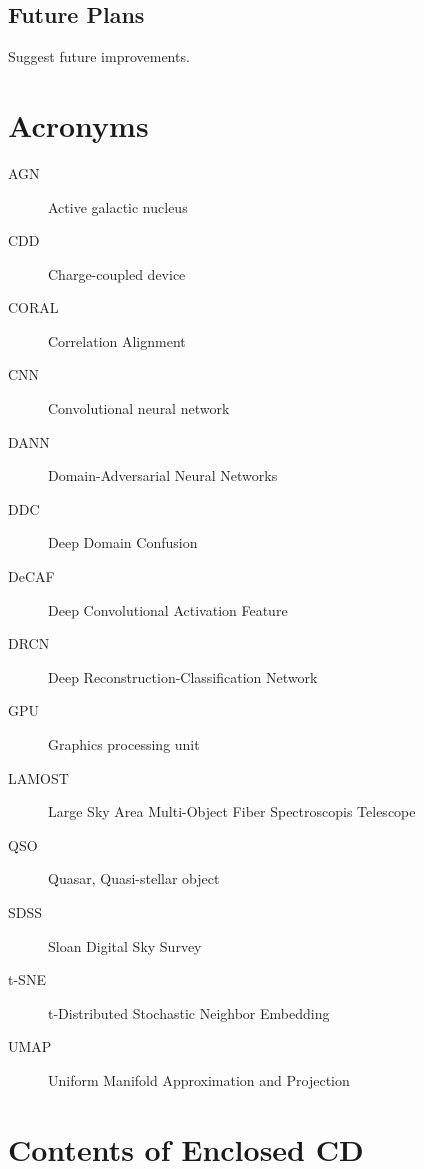 \documentclass[thesis=M,english]{FITthesis}[2012/10/20]
\theoremstyle{definition}
\begin{document}
\section{Future Plans}

Suggest future improvements.




\appendix

\chapter{Acronyms}

\begin{description}
	\item[AGN] Active galactic nucleus
	\item[CDD] Charge-coupled device
	\item[CORAL] Correlation Alignment
	\item[CNN] Convolutional neural network
	\item[DANN] Domain-Adversarial Neural Networks
	\item[DDC] Deep Domain Confusion
	\item[DeCAF] Deep Convolutional Activation Feature
	\item[DRCN] Deep Reconstruction-Classification Network
	\item[GPU] Graphics processing unit
	\item[LAMOST] Large Sky Area Multi-Object Fiber Spectroscopis Telescope
	\item[QSO] Quasar, Quasi-stellar object
	\item[SDSS] Sloan Digital Sky Survey
	\item[t-SNE] t-Distributed Stochastic Neighbor Embedding
	\item[UMAP] Uniform Manifold Approximation and Projection
\end{description}

\chapter{Contents of Enclosed CD}

\begin{figure}
\end{figure}
\end{document}
